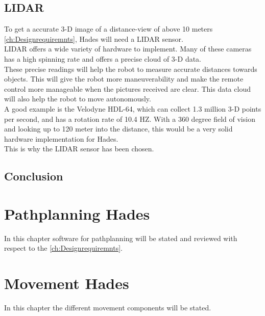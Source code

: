 \section{LIDAR}
To get a accurate 3-D image of a distance-view of above 10 meters \ref{ch:Designrequiremnts}, Hades will need a LIDAR sensor.\\
LIDAR offers a wide variety of hardware to implement. Many of these cameras has a high spinning rate and offers a precise cloud of 3-D data.\\
These precise readings will help the robot to measure accurate distances towards objects. This will give the robot more maneuverability and make the remote control more manageable when the pictures received are clear. This data cloud will also help the robot to move autonomously.\\
A good example is the Velodyne HDL-64, which can collect 1.3 million 3-D points per second, and has a rotation rate of 10.4 HZ. With a 360 degree field of vision and looking up to 120 meter into the distance, this would be a very solid hardware implementation for Hades. \cite{Lidar360}\\
This is why the LIDAR sensor has been chosen.\\

\section{}


\section{Conclusion}


\chapter{Pathplanning Hades} \label{ch:PathplanningHades}

In this chapter software for pathplanning will be stated and reviewed with respect to the \ref{ch:Designrequiremnts}.

\section{}


\chapter{Movement Hades} \label{ch:MovementHades}

In this chapter the different movement components will be stated.\\